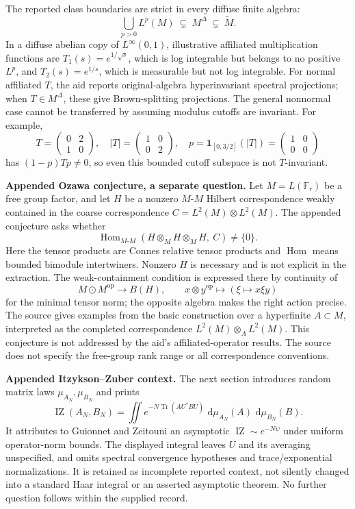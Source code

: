 \documentclass[11pt]{article}
\newcommand{\dd}{\,\mathrm{d}}
\begin{document}
The reported class boundaries are strict in every diffuse finite algebra:
\[
 \bigcup_{p>0}L^p(M)\ \subsetneq\ M^\Delta\ \subsetneq\ \widetilde M.
\]
In a diffuse abelian copy of \(L^\infty(0,1)\), illustrative affiliated multiplication functions are \(T_1(s)=e^{1/\sqrt s}\), which is log integrable but belongs to no positive \(L^p\), and \(T_2(s)=e^{1/s}\), which is measurable but not log integrable. For normal affiliated \(T\), the aid reports original-algebra hyperinvariant spectral projections; when \(T\in M^\Delta\), these give Brown-splitting projections. The general nonnormal case cannot be transferred by assuming modulus cutoffs are invariant. For example,
\[
 T=\begin{pmatrix}0&2\\1&0\end{pmatrix},\quad
 |T|=\begin{pmatrix}1&0\\0&2\end{pmatrix},\quad
 p=\mathbf1_{[0,3/2]}(|T|)=\begin{pmatrix}1&0\\0&0\end{pmatrix}
\]
has \((1-p)Tp\ne0\), so even this bounded cutoff subspace is not \(T\)-invariant.

\textbf{Appended Ozawa conjecture, a separate question.} Let \(M=L(\mathbb F_r)\) be a free group factor, and let \(H\) be a nonzero \(M\)-\(M\) Hilbert correspondence weakly contained in the coarse correspondence \(C=L^2(M)\otimes L^2(M)\). The appended conjecture asks whether
\[
 \operatorname{Hom}_{M\text{-}M}
       (H\otimes_MH\otimes_MH,\ C)\ne\{0\}.
\]
Here the tensor products are Connes relative tensor products and \(\operatorname{Hom}\) means bounded bimodule intertwiners. Nonzero \(H\) is necessary and is not explicit in the extraction. The weak-containment condition is expressed there by continuity of
\[
 M\odot M^{\mathrm{op}}\longrightarrow B(H),\qquad
 x\otimes y^{\mathrm{op}}\longmapsto(\xi\mapsto x\xi y)
\]
for the minimal tensor norm; the opposite algebra makes the right action precise. The source gives examples from the basic construction over a hyperfinite \(A\subset M\), interpreted as the completed correspondence \(L^2(M)\otimes_A L^2(M)\). This conjecture is not addressed by the aid's affiliated-operator results. The source does not specify the free-group rank range or all correspondence conventions.

\textbf{Appended Itzykson--Zuber context.} The next section introduces random matrix laws \(\mu_{A_N},\mu_{B_N}\) and prints
\[
 \operatorname{IZ}(A_N,B_N)=\iint
 e^{-N\operatorname{Tr}(AU^*BU)}\,
                  \dd\mu_{A_N}(A)\,\dd\mu_{B_N}(B).
\]
It attributes to Guionnet and Zeitouni an asymptotic \(\operatorname{IZ}\sim e^{-N\psi}\) under uniform operator-norm bounds. The displayed integral leaves \(U\) and its averaging unspecified, and omits spectral convergence hypotheses and trace/exponential normalizations. It is retained as incomplete reported context, not silently changed into a standard Haar integral or an asserted asymptotic theorem. No further question follows within the supplied record.
\end{document}
